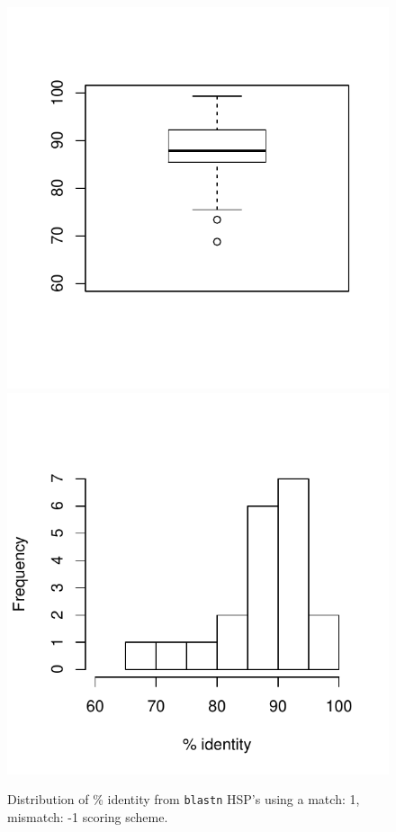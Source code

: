 \documentclass{article}\usepackage[]{graphicx}\usepackage[]{color}
\newenvironment{knitrout}{}{} %
\begin{document}
\begin{figure}
\begin{knitrout}
\color{fgcolor}

{\centering \includegraphics[width=.49\linewidth]{figure/pident_3_fig1} 
\includegraphics[width=.49\linewidth]{figure/pident_3_fig2} 

}



\end{knitrout}
\caption{Distribution of \% identity from \texttt{blastn} HSP's using a match: 1, mismatch: -1 scoring scheme.}
\end{figure}
\end{document}
